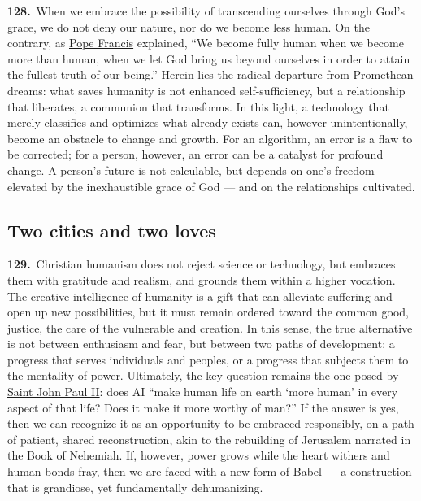 \documentclass{article}
\begin{document}
\textbf{128.}\ When we embrace the possibility of transcending ourselves through God's grace, we do not deny our nature, nor do we become less human. On the contrary, as \href{https://www.vatican.va/content/francesco/en.html}{Pope Francis} explained, ``We become fully human when we become more than human, when we let God bring us beyond ourselves in order to attain the fullest truth of our being.''\cite{n137} Herein lies the radical departure from Promethean dreams: what saves humanity is not enhanced self-sufficiency, but a relationship that liberates, a communion that transforms. In this light, a technology that merely classifies and optimizes what already exists can, however unintentionally, become an obstacle to change and growth. For an algorithm, an error is a flaw to be corrected; for a person, however, an error can be a catalyst for profound change. A person's future is not calculable, but depends on one's freedom --- elevated by the inexhaustible grace of God --- and on the relationships cultivated.

\subsection{Two cities and two loves}

\textbf{129.}\ Christian humanism does not reject science or technology, but embraces them with gratitude and realism, and grounds them within a higher vocation. The creative intelligence of humanity is a gift that can alleviate suffering and open up new possibilities, but it must remain ordered toward the common good, justice, the care of the vulnerable and creation. In this sense, the true alternative is not between enthusiasm and fear, but between two paths of development: a progress that serves individuals and peoples, or a progress that subjects them to the mentality of power. Ultimately, the key question remains the one posed by \href{https://www.vatican.va/content/john-paul-ii/en.html}{Saint John Paul II}: does AI ``make human life on earth `more human' in every aspect of that life? Does it make it more worthy of man?''\cite{n138} If the answer is yes, then we can recognize it as an opportunity to be embraced responsibly, on a path of patient, shared reconstruction, akin to the rebuilding of Jerusalem narrated in the Book of Nehemiah. If, however, power grows while the heart withers and human bonds fray, then we are faced with a new form of Babel --- a construction that is grandiose, yet fundamentally dehumanizing.
\end{document}
